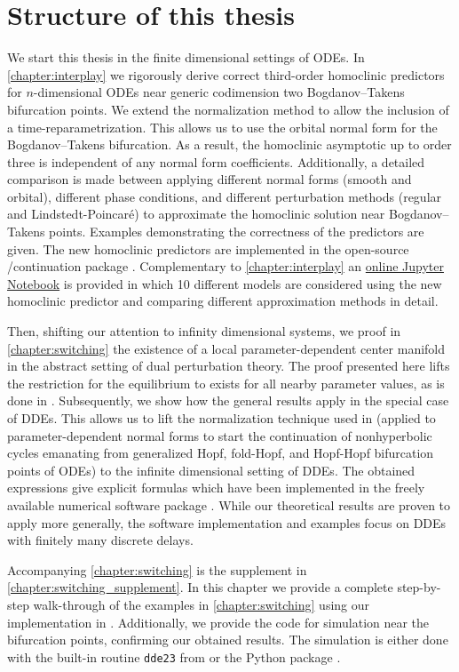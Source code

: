 \section{Structure of this thesis}
We start this thesis in the finite dimensional settings of ODEs. In
\cref{chapter:interplay} we rigorously derive correct third-order homoclinic
predictors for $n$-dimensional ODEs near generic codimension two Bogdanov--Takens
bifurcation points. We extend the normalization method to allow the inclusion of
a time-reparametrization. This allows us to use the orbital normal form for the
Bogdanov--Takens bifurcation. As a result, the homoclinic asymptotic up to order
three is independent of any normal form coefficients. Additionally, a detailed
comparison is made between applying different normal forms (smooth and orbital),
different phase conditions, and different perturbation methods (regular and
Lindstedt-Poincar\'e) to approximate the homoclinic solution near
Bogdanov--Takens points.  Examples demonstrating the correctness of the
predictors are given. The new homoclinic predictors are implemented in the
open-source \MATLAB/\OCTAVE continuation package \MATCONT. Complementary to
\cref{chapter:interplay} an
\href{https://mmbosschaert.github.io/MatCont7p2NewInitBTHom-/}{online Jupyter
Notebook} is provided in which 10 different models are considered using the new
homoclinic predictor and comparing different approximation methods in detail.

Then, shifting our attention to infinity dimensional systems,  we proof in
\cref{chapter:switching} the existence of a local parameter-dependent center
manifold in the abstract setting of dual perturbation theory. The proof
presented here lifts the restriction for the equilibrium to exists for all
nearby parameter values, as is done in \cite{diekmann1995delay}. Subsequently,
we show how the general results apply in the special case of DDEs. This allows
us to lift the normalization technique used in \cite{Kuznetsov2008} (applied to
parameter-dependent normal forms to start the continuation of nonhyperbolic
cycles emanating from generalized Hopf, fold-Hopf, and Hopf-Hopf bifurcation
points of ODEs) to the infinite dimensional setting of DDEs. The obtained
expressions give explicit formulas which have been implemented in the freely
available numerical software package \DDEBIFTOOL. While our theoretical results
are proven to apply more generally, the software implementation and examples
focus on DDEs with finitely many discrete delays.

Accompanying \cref{chapter:switching} is the supplement in
\cref{chapter:switching_supplement}. In this chapter we provide a complete
step-by-step walk-through of the examples in \cref{chapter:switching} using our
implementation in \DDEBIFTOOL. Additionally, we provide the code for simulation
near the bifurcation points, confirming our obtained results. The simulation is
either done with the built-in routine \lstinline|dde23| from \MATLAB
\cite{Shampine01solvingdelay} or the Python package \PYDELAY
\cite{Flunkert2009Flunkert}.

